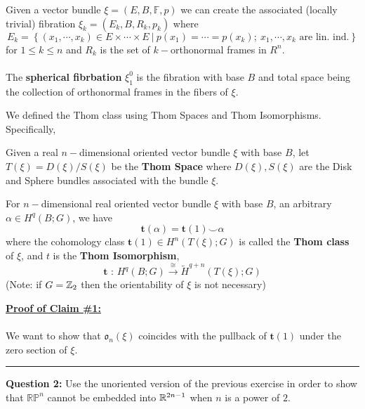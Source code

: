 \documentclass[11pt]{article}
\begin{document}
\begin{definition}
  Given a vector bundle $\xi = (E, B, \mathbb{F}, p)$ we can create the associated (locally trivial) fibration $\xi_k = (E_k, B, R_k, p_k)$ where $$ E_k = \left\{ (x_1, \cdots, x_k) \in E \times \cdots \times E ~|~ p(x_1) = \cdots = p(x_k);~ x_1, \cdots, x_k \text{ are lin. ind.}  \right\} $$ for $1 \leq k \leq n$ and $R_k$ is the set of $k-$orthonormal frames in $R^n$.
  \\
  \\
  The \textbf{spherical fibrbation} $\xi_1^0$ is the fibration with base $B$ and total space being the collection of orthonormal frames in the fibers of $\xi$.
\end{definition}


We defined the Thom class using Thom Spaces and Thom Isomorphisms. Specifically,

\begin{definition}
  Given a real $n-$dimensional oriented vector bundle $\xi$ with base $B$, let $T(\xi) = D(\xi) / S(\xi)$ be the \textbf{Thom Space} where $D(\xi), S(\xi)$ are the Disk and Sphere bundles associated with the bundle $\xi$.
\end{definition}

\begin{definition}
  For $n-$dimensional real oriented vector bundle $\xi$ with base $B$, an arbitrary $\alpha \in H^q(B; G)$, we have $$ \textbf{t}(\alpha) = \textbf{t}(1) \smile \alpha $$ where the cohomology class $\textbf{t}(1) \in H^n(T(\xi); G)$  is called the \textbf{Thom class} of $\xi$, and $t$ is the \textbf{Thom Isomorphism}, $$\mathbf{t} \text{ : } H^q(B; G) \xrightarrow{\cong} \tilde{H}^{q+n}(T(\xi); G) $$ (Note: if $G = \mathbb{Z}_2$ then the orientability of $\xi$ is not necessary)
\end{definition} \textbf{\underline{Proof of Claim \#1:}} \\ 
\\
We want to show that $\mathfrak{o}_n(\xi)$ coincides with the pullback of $\mathbf{t}(1)$ under the zero section of $\xi$.


\vskip 0.5cm
\hrule
\pagebreak


\begin{bluebox}
  \textbf{Question 2:} Use the unoriented version of the previous exercise in order to show that $\mathbb{RP}^n$ cannot be embedded into $\mathbb{R}^{2n-1}$ when $n$ is a power of $2$.

\end{bluebox}
\end{document}
